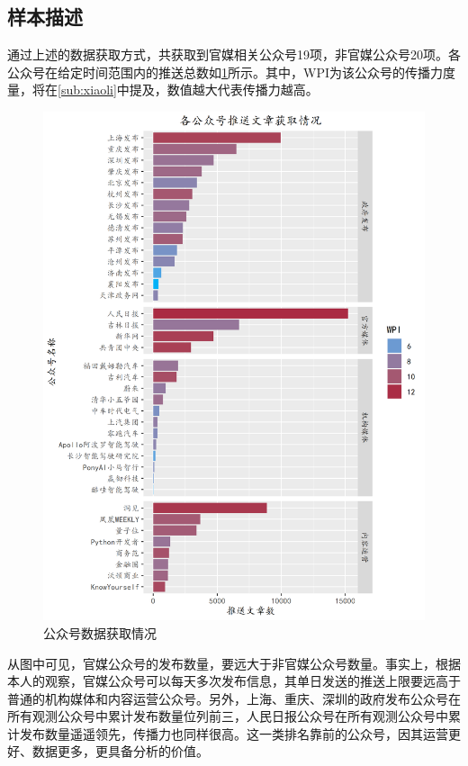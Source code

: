 \documentclass[a4paper,12pt,UTF8]{article}
\begin{document}
    \subsection{样本描述}
    通过上述的数据获取方式，共获取到官媒相关公众号19项，非官媒公众号20项。各公众号在给定时间范围内的推送总数如\cref{fig:profiles}所示。其中，WPI为该公众号的传播力度量，将在\cref{sub:xiaoli}中提及，数值越大代表传播力越高。
    \begin{figure}
      \centering
      \includegraphics[width=1\linewidth]{profiles.png}
      \caption{公众号数据获取情况}
      \label{fig:profiles}
    \end{figure}
    
    从图中可见，官媒公众号的发布数量，要远大于非官媒公众号数量。事实上，根据本人的观察，官媒公众号可以每天多次发布信息，其单日发送的推送上限要远高于普通的机构媒体和内容运营公众号。另外，上海、重庆、深圳的政府发布公众号在所有观测公众号中累计发布数量位列前三，人民日报公众号在所有观测公众号中累计发布数量遥遥领先，传播力也同样很高。这一类排名靠前的公众号，因其运营更好、数据更多，更具备分析的价值。
\end{document}
